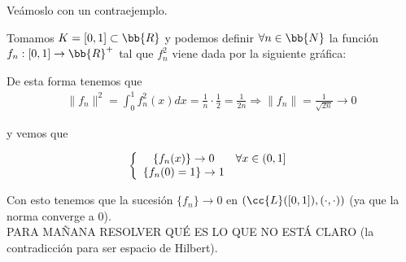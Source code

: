 \begin{ejemplo}

    Veámoslo con un contraejemplo.

    Tomamos $K = [0,1]\subset \bb{R}$ y podemos definir $\forall n \in \bb{N}$ la función  $f_n : [0,1] \to \bb{R}^+$ tal que $f_n^2$ viene dada por la siguiente gráfica:

    \begin{figure}[H]
        \centering
    \end{figure}

    De esta forma tenemos que
    \begin{gather*}
        \|f_n\|^2 = \int_0^1 f_n^2(x) dx = \frac{1}{n} \cdot \frac{1}{2} = \frac{1}{2n} \Rightarrow \|f_n\| = \frac{1}{\sqrt{2n}} \to 0
    \end{gather*}

    y vemos que

    \begin{gather*}
        \left\{
        \begin{array}{c  c}
            \{f_n(x)\} \to 0 & \forall x\in (0,1]\\
            \{f_n(0) = 1\} \to 1 &\\
        \end{array}
        \right.
    \end{gather*}

    Con esto tenemos que la sucesión $\{f_n\} \to 0$ en $(\cc{L}([0,1]), (\cdot,\cdot))$ (ya que la norma converge a 0).\\

    PARA MAÑANA RESOLVER QUÉ ES LO QUE NO ESTÁ CLARO (la contradicción para ser espacio de Hilbert).\\
\end{ejemplo}

